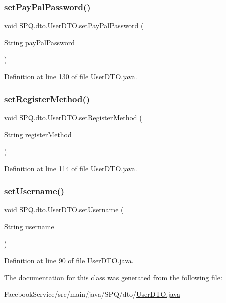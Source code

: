 \subsubsection{\texorpdfstring{set\+Pay\+Pal\+Password()}{setPayPalPassword()}}
{\footnotesize\ttfamily void S\+P\+Q.\+dto.\+User\+D\+T\+O.\+set\+Pay\+Pal\+Password (\begin{DoxyParamCaption}\item[{String}]{pay\+Pal\+Password }\end{DoxyParamCaption})}



Definition at line 130 of file User\+D\+T\+O.\+java.

\mbox{\label{class_s_p_q_1_1dto_1_1_user_d_t_o_a8e4fb216f49f13c196598119a15556ea}} 
\subsubsection{\texorpdfstring{set\+Register\+Method()}{setRegisterMethod()}}
{\footnotesize\ttfamily void S\+P\+Q.\+dto.\+User\+D\+T\+O.\+set\+Register\+Method (\begin{DoxyParamCaption}\item[{String}]{register\+Method }\end{DoxyParamCaption})}



Definition at line 114 of file User\+D\+T\+O.\+java.

\mbox{\label{class_s_p_q_1_1dto_1_1_user_d_t_o_a53003074966a77e89f5900344ab79b15}} 
\subsubsection{\texorpdfstring{set\+Username()}{setUsername()}}
{\footnotesize\ttfamily void S\+P\+Q.\+dto.\+User\+D\+T\+O.\+set\+Username (\begin{DoxyParamCaption}\item[{String}]{username }\end{DoxyParamCaption})}



Definition at line 90 of file User\+D\+T\+O.\+java.



The documentation for this class was generated from the following file\+:\begin{DoxyCompactItemize}
\item 
Facebook\+Service/src/main/java/\+S\+P\+Q/dto/\mbox{\hyperlink{_facebook_service_2src_2main_2java_2_s_p_q_2dto_2_user_d_t_o_8java}{User\+D\+T\+O.\+java}}\end{DoxyCompactItemize}
